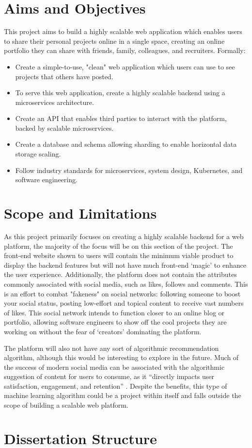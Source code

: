 \section{Aims and Objectives}
\label{sec:intro-aims}
This project aims to build a highly scalable web application which enables users to share their personal projects online in a single space, creating an online portfolio they can share with friends, family, colleagues, and recruiters.
Formally:
\begin{itemize}
    \item Create a simple-to-use, "clean" web application which users can use to see projects that others have posted.
    \item To serve this web application, create a highly scalable backend using a microservices architecture.
    \item Create an API that enables third parties to interact with the platform, backed by scalable microservices.
    \item Create a database and schema allowing sharding to enable horizontal data storage scaling.
    \item Follow industry standards for microservices, system design, Kubernetes, and software engineering.
\end{itemize}

\section{Scope and Limitations}
\label{sec:intro-scope}
As this project primarily focuses on creating a highly scalable backend for a web platform, the majority of the focus will be on this section of the project. 
The front-end website shown to users will contain the minimum viable product to display the backend features but will not have much front-end `magic' to enhance the user experience.
Additionally, the platform does not contain the attributes commonly associated with social media, such as likes, follows and comments.
This is an effort to combat "fakeness" on social networks: following someone to boost your social status, posting low-effort and topical content to receive vast numbers of likes.
This social network intends to function closer to an online blog or portfolio, allowing software engineers to show off the cool projects they are working on without the fear of `creators' dominating the platform. 

The platform will also not have any sort of algorithmic recommendation algorithm, although this would be interesting to explore in the future. 
Much of the success of modern social media can be associated with the algorithmic suggestion of content for users to consume, as it ``directly impacts user satisfaction, engagement, and retention'' \citep{chen2024algocontent}. 
Despite the benefits, this type of machine learning algorithm could be a project within itself and falls outside the scope of building a scalable web platform.

\section{Dissertation Structure}
\label{sec:intro-structure}
